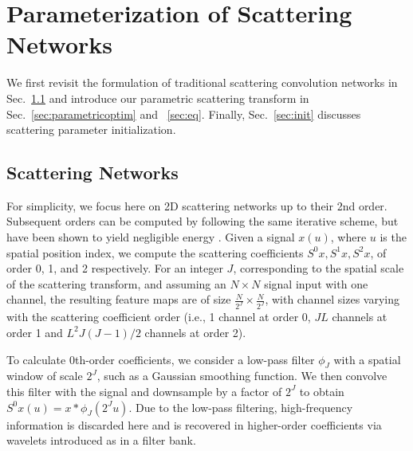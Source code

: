 \documentclass[10pt,twocolumn,letterpaper]{article}
\begin{document}
\section{Parameterization of Scattering Networks}
\label{sec:parametric_scattering_networks}
We first revisit the formulation of traditional scattering convolution networks in Sec.~\ref{sec:scatteringnetworks} and introduce our parametric scattering transform in Sec.~\ref{sec:parametricoptim} and ~\ref{sec:eq}. Finally, Sec.~\ref{sec:init} discusses scattering parameter initialization.

\subsection{Scattering Networks}
\label{sec:scatteringnetworks}

For simplicity, we focus here on 2D scattering networks up to their 2nd order. Subsequent orders can be computed by following the same iterative scheme, but have been shown to yield negligible energy \cite{bruna2013invariant}. Given a signal $x(u)$, where $u$ is the spatial position index, we compute the scattering coefficients $S^0x, S^1x, S^2x$, of order 0, 1, and 2 respectively. For an integer $J$, corresponding to the spatial scale of the scattering transform, and assuming an $N \times N$ signal input with one channel, the resulting feature maps are of size $\frac{N}{2^J}\times\frac{N}{2^J}$, with channel sizes varying with the scattering coefficient order (i.e., 1 channel at order 0, $JL$ channels at order 1 and $L^2J(J-1)/2 $ channels at order 2).   

To calculate 0th-order coefficients, we consider a low-pass filter $\phi_J$ with a spatial window of scale $2^J$, such as a Gaussian smoothing function. We then convolve this filter with the signal and downsample by a factor of $2^J$ to obtain $S^0x(u) = x*\phi_J(2^Ju).$
Due to the low-pass filtering, high-frequency information is discarded here and is recovered in higher-order coefficients via wavelets introduced as in a filter bank.
\end{document}
